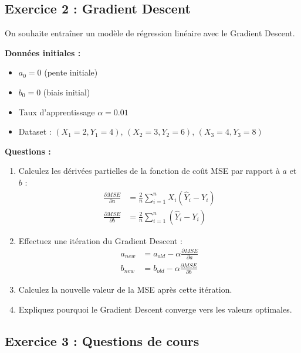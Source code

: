 \documentclass[11pt,a4paper]{article}
\begin{document}
\subsection{Exercice 2 : Gradient Descent}

\begin{questionbox}
On souhaite entraîner un modèle de régression linéaire avec le Gradient Descent.

\textbf{Données initiales :}
\begin{itemize}
    \item $a_0 = 0$ (pente initiale)
    \item $b_0 = 0$ (biais initial)
    \item Taux d'apprentissage $\alpha = 0.01$
    \item Dataset : $(X_1=2, Y_1=4)$, $(X_2=3, Y_2=6)$, $(X_3=4, Y_3=8)$
\end{itemize}

\textbf{Questions :}
\begin{enumerate}
    \item Calculez les dérivées partielles de la fonction de coût MSE par rapport à $a$ et $b$ :
    \begin{align*}
    \frac{\partial MSE}{\partial a} &= \frac{2}{n}\sum_{i=1}^{n}X_i(\hat{Y}_i - Y_i) \\
    \frac{\partial MSE}{\partial b} &= \frac{2}{n}\sum_{i=1}^{n}(\hat{Y}_i - Y_i)
    \end{align*}
    
    \item Effectuez une itération du Gradient Descent :
    \begin{align*}
    a_{new} &= a_{old} - \alpha \frac{\partial MSE}{\partial a} \\
    b_{new} &= b_{old} - \alpha \frac{\partial MSE}{\partial b}
    \end{align*}
    
    \item Calculez la nouvelle valeur de la MSE après cette itération.
    
    \item Expliquez pourquoi le Gradient Descent converge vers les valeurs optimales.
\end{enumerate}
\end{questionbox}

\subsection{Exercice 3 : Questions de cours}
\end{document}
